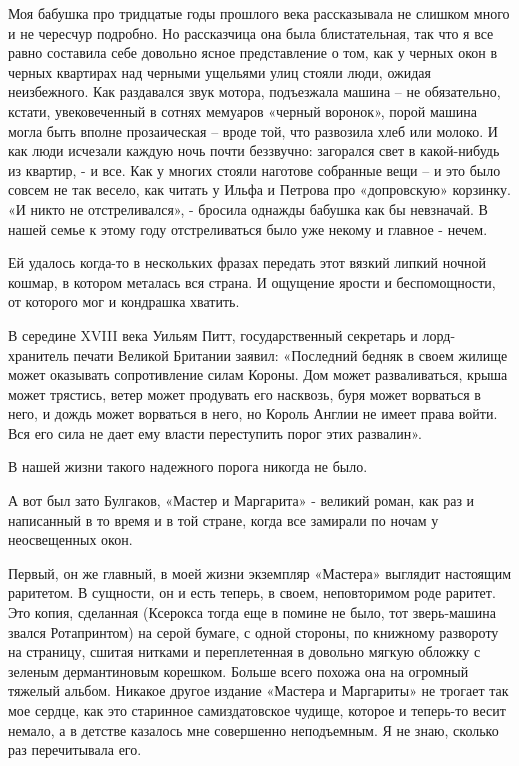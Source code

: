 Моя бабушка про тридцатые годы прошлого века рассказывала не слишком много и не
чересчур подробно. Но рассказчица она была блистательная, так что я все равно
составила себе довольно ясное представление о том, как у черных окон в черных
квартирах над черными ущельями улиц стояли люди, ожидая неизбежного. Как
раздавался звук мотора, подъезжала машина – не обязательно, кстати,
увековеченный в сотнях мемуаров «черный воронок», порой машина могла быть
вполне прозаическая – вроде той, что развозила хлеб или молоко. И как люди
исчезали каждую ночь почти беззвучно: загорался свет в какой-нибудь из квартир,
- и все. Как у многих стояли наготове собранные вещи – и это было совсем не так
весело, как читать у Ильфа и Петрова про «допровскую» корзинку. «И никто не
отстреливался», - бросила однажды бабушка как бы невзначай. В нашей семье к
этому году отстреливаться было уже некому и главное - нечем.

Ей удалось когда-то в нескольких фразах передать этот вязкий липкий ночной
кошмар, в котором металась вся страна. И ощущение ярости и беспомощности, от
которого мог и кондрашка хватить.

В середине XVIII века Уильям Питт, государственный секретарь и лорд-хранитель
печати Великой Британии заявил: «Последний бедняк в своем жилище может
оказывать сопротивление силам Короны. Дом может разваливаться, крыша может
трястись, ветер может продувать его насквозь, буря может ворваться в него, и
дождь может ворваться в него, но Король Англии не имеет права войти. Вся его
сила не дает ему власти переступить порог этих развалин».

В нашей жизни такого надежного порога никогда не было.

А вот был зато Булгаков, «Мастер и Маргарита» - великий роман, как раз и
написанный в то время и в той стране, когда все замирали по ночам у
неосвещенных окон.

Первый, он же главный, в моей жизни экземпляр «Мастера» выглядит настоящим
раритетом. В сущности, он и есть теперь, в своем, неповторимом роде раритет.
Это копия, сделанная (Ксерокса тогда еще в помине не было, тот зверь-машина
звался Ротапринтом) на серой бумаге, с одной стороны, по книжному развороту на
страницу, сшитая нитками и переплетенная в довольно мягкую обложку с зеленым
дермантиновым корешком. Больше всего похожа она на огромный тяжелый альбом.
Никакое другое издание «Мастера и Маргариты» не трогает так мое сердце, как это
старинное самиздатовское чудище, которое и теперь-то весит немало, а в детстве
казалось мне совершенно неподъемным. Я не знаю, сколько раз перечитывала его.

